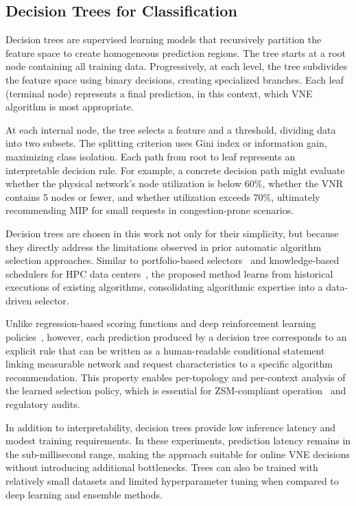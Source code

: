 \documentclass[a4paper,twoside]{article}
\begin{document}
\subsection{Decision Trees for Classification}
\label{subsec:trees}

Decision trees are supervised learning models that recursively partition the feature space to create homogeneous prediction regions.
The tree starts at a root node containing all training data.
Progressively, at each level, the tree subdivides the feature space using binary decisions, creating specialized branches.
Each leaf (terminal node) represents a final prediction, in this context, which VNE algorithm is most appropriate.



At each internal node, the tree selects a feature and a threshold, dividing data into two subsets. The splitting criterion uses Gini index or information gain, maximizing class isolation. Each path from root to leaf represents an interpretable decision rule.
%
For example, a concrete decision path might evaluate whether the physical network's node utilization is below 60\%, whether the VNR contains 5 nodes or fewer, and whether utilization exceeds 70\%, ultimately recommending MIP for small requests in congestion-prone scenarios.

Decision trees are chosen in this work not only for their simplicity, but because they directly address the limitations observed in prior automatic algorithm selection approaches. Similar to portfolio-based selectors~\cite{xu2012satzilla} and knowledge-based schedulers for HPC data centers~\cite{koslowski2025knowledge-based}, the proposed method learns from historical executions of existing algorithms, consolidating algorithmic expertise into a data-driven selector.

Unlike regression-based scoring functions and deep reinforcement learning policies~\cite{cao2018nfv-deeprl,ijcai-2024-flagvne}, however, each prediction produced by a decision tree corresponds to an explicit rule that can be written as a human-readable conditional statement linking measurable network and request characteristics to a specific algorithm recommendation. This property enables per-topology and per-context analysis of the learned selection policy, which is essential for ZSM-compliant operation~\cite{white2024zerotough} and regulatory audits.

In addition to interpretability, decision trees provide low inference latency and modest training requirements. In these experiments, prediction latency remains in the sub-millisecond range, making the approach suitable for online VNE decisions without introducing additional bottlenecks. Trees can also be trained with relatively small datasets and limited hyperparameter tuning when compared to deep learning and ensemble methods.
\end{document}

